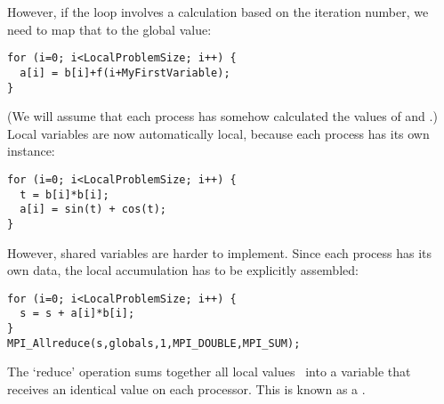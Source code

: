 However, if the loop involves a calculation based on the iteration
number, we need to map that to the global value:
\begin{verbatim}
for (i=0; i<LocalProblemSize; i++) {
  a[i] = b[i]+f(i+MyFirstVariable);
}
\end{verbatim}
(We will assume that each process has somehow calculated the values of
 and .)
Local variables are now automatically local, because each process has
its own instance:
\begin{verbatim}
for (i=0; i<LocalProblemSize; i++) {
  t = b[i]*b[i];
  a[i] = sin(t) + cos(t);
}
\end{verbatim}
However, shared variables are harder to implement. Since each process
has its own data, the local accumulation has to be explicitly assembled:
\begin{verbatim}
for (i=0; i<LocalProblemSize; i++) {
  s = s + a[i]*b[i];
}
MPI_Allreduce(s,globals,1,MPI_DOUBLE,MPI_SUM);
\end{verbatim}
The `reduce' operation sums together all local values~ into a
variable  that receives an identical value on each
processor. This is known as a .

